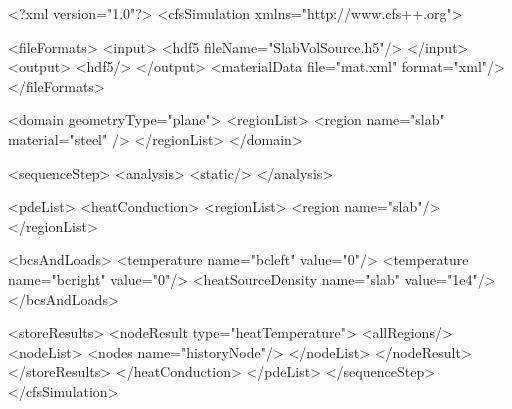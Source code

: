 {\footnotesize
\begin{xmllisting}
<?xml version="1.0"?>
<cfsSimulation xmlns="http://www.cfs++.org">

   <fileFormats>
   <input>
      <hdf5 fileName="SlabVolSource.h5"/>
   </input>
    <output>
      <hdf5/>
    </output>
    <materialData file="mat.xml" format="xml"/>
  </fileFormats>

  <domain geometryType="plane">
    <regionList>
      <region name="slab" material="steel" />
    </regionList>
  </domain>

  <sequenceStep>
   <analysis>
      <static/>
    </analysis>

    <pdeList>
      <heatConduction>
        <regionList>
          <region name="slab"/>
        </regionList>
        
        <bcsAndLoads>
          <temperature name="bcleft" value="0"/>
          <temperature name="bcright" value="0"/>
          <heatSourceDensity name="slab" value="1e4"/>          
        </bcsAndLoads>
        
        <storeResults>
          <nodeResult type="heatTemperature">
            <allRegions/>
            <nodeList>
              <nodes name="historyNode"/>
            </nodeList>
          </nodeResult>
        </storeResults>
      </heatConduction>
    </pdeList> 
  </sequenceStep>
</cfsSimulation>
\end{xmllisting}
}
